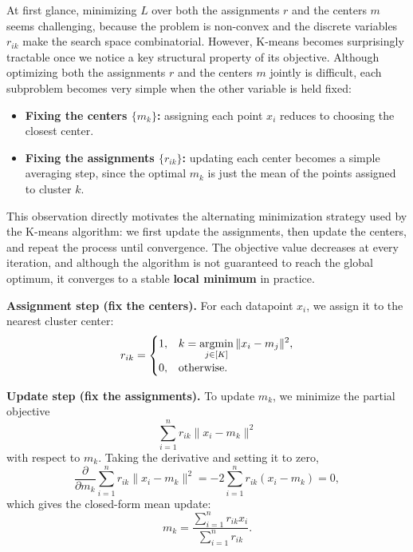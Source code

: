\documentclass[../main]{subfiles}
\begin{document}
At first glance, minimizing \(L\) over both the assignments \(r\) and the centers \(m\) seems challenging,  
because the problem is non-convex and the discrete variables \(r_{ik}\) make the search space combinatorial.  
However, K-means becomes surprisingly tractable once we notice a key structural property of its objective.  
Although optimizing both the assignments \(r\) and the centers \(m\) jointly is difficult,  
each subproblem becomes very simple when the other variable is held fixed:

\begin{itemize}
    \item \textbf{Fixing the centers \(\{m_k\}\):}  
    assigning each point \(x_i\) reduces to choosing the closest center.

    \item \textbf{Fixing the assignments \(\{r_{ik}\}\):}  
    updating each center becomes a simple averaging step, since the optimal \(m_k\) is just the mean of the points assigned to cluster \(k\).
\end{itemize}

This observation directly motivates the alternating minimization strategy used by the K-means algorithm:  
we first update the assignments, then update the centers, and repeat the process until convergence.  
The objective value decreases at every iteration, and although the algorithm is not guaranteed to reach the global optimum,  
it converges to a stable \textbf{local minimum} in practice.

\textbf{Assignment step (fix the centers).}  
For each datapoint \(x_i\), we assign it to the nearest cluster center:
\begin{equation}
    r_{ik} =
    \begin{cases}
        1,
        & k = \displaystyle\mathop{\mathrm{argmin}}_{j\in[K]} \|x_i - m_j\|^2, \\[6pt]
        0,
        & \text{otherwise}.
    \end{cases}
\end{equation}

\textbf{Update step (fix the assignments).}  
To update \(m_k\), we minimize the partial objective
\begin{equation}
    \sum_{i=1}^{n} r_{ik} \|x_i - m_k\|^2
\end{equation}
with respect to \(m_k\).  
Taking the derivative and setting it to zero,
\begin{equation}
    \frac{\partial}{\partial m_k}
    \sum_{i=1}^{n} r_{ik} \|x_i - m_k\|^2
    =
    -2 \sum_{i=1}^{n} r_{ik} (x_i - m_k)
    = 0,
\end{equation}
which gives the closed-form mean update:
\begin{equation}
    m_k
    =
    \frac{\sum_{i=1}^{n} r_{ik} x_i}
         {\sum_{i=1}^{n} r_{ik}}.
\end{equation}
\end{document}
